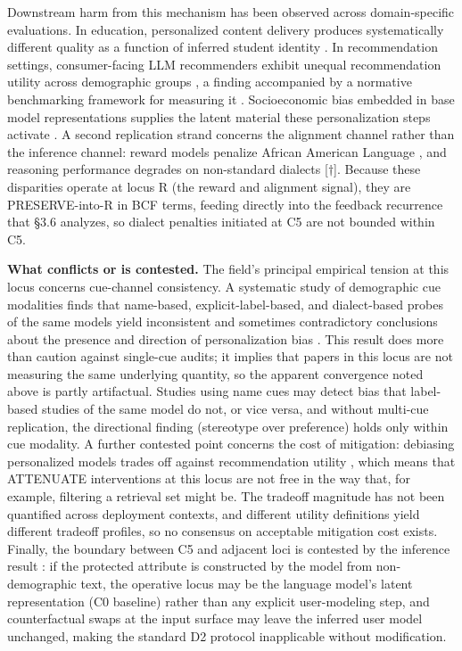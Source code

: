 \documentclass[10pt]{article}
\begin{document}
Downstream harm from this mechanism has been observed across domain-specific evaluations. In education, personalized content delivery produces systematically different quality as a function of inferred student identity \cite{weissburg2024llms}. In recommendation settings, consumer-facing LLM recommenders exhibit unequal recommendation utility across demographic groups \cite{deldjoo2024cfairllm}, a finding accompanied by a normative benchmarking framework for measuring it \cite{deldjoo2024normative}. Socioeconomic bias embedded in base model representations supplies the latent material these personalization steps activate \cite{arzaghi2024understanding}. A second replication strand concerns the alignment channel rather than the inference channel: reward models penalize African American Language \cite{mire2025rejected}, and reasoning performance degrades on non-standard dialects \cite{lin2024assessing}[$\dagger$]. Because these disparities operate at locus R (the reward and alignment signal), they are PRESERVE-into-R in BCF terms, feeding directly into the feedback recurrence that \S{}3.6 analyzes, so dialect penalties initiated at C5 are not bounded within C5.

\textbf{What conflicts or is contested.} The field's principal empirical tension at this locus concerns cue-channel consistency. A systematic study of demographic cue modalities finds that name-based, explicit-label-based, and dialect-based probes of the same models yield inconsistent and sometimes contradictory conclusions about the presence and direction of personalization bias \cite{tonneau2026different}. This result does more than caution against single-cue audits; it implies that papers in this locus are not measuring the same underlying quantity, so the apparent convergence noted above is partly artifactual. Studies using name cues may detect bias that label-based studies of the same model do not, or vice versa, and without multi-cue replication, the directional finding (stereotype over preference) holds only within cue modality. A further contested point concerns the cost of mitigation: debiasing personalized models trades off against recommendation utility \cite{vijjini2024exploring}, which means that ATTENUATE interventions at this locus are not free in the way that, for example, filtering a retrieval set might be. The tradeoff magnitude has not been quantified across deployment contexts, and different utility definitions yield different tradeoff profiles, so no consensus on acceptable mitigation cost exists. Finally, the boundary between C5 and adjacent loci is contested by the inference result \cite{staab2023memorization}: if the protected attribute is constructed by the model from non-demographic text, the operative locus may be the language model's latent representation (C0 baseline) rather than any explicit user-modeling step, and counterfactual swaps at the input surface may leave the inferred user model unchanged, making the standard D2 protocol inapplicable without modification.
\end{document}
